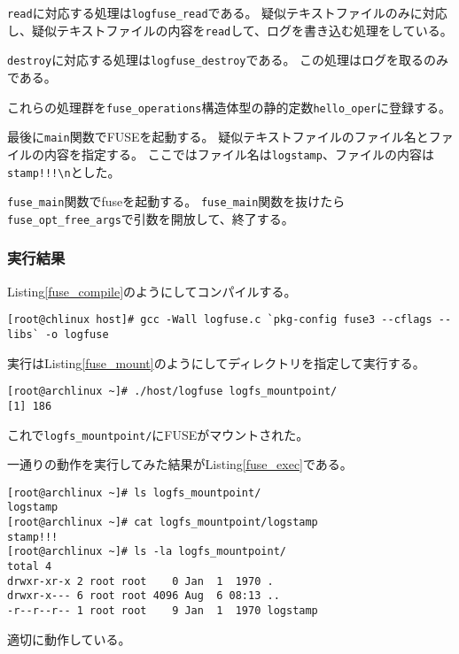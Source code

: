 \documentclass[main]{subfiles}
\begin{document}
\texttt{read}に対応する処理は\texttt{logfuse\_read}である。
疑似テキストファイルのみに対応し、疑似テキストファイルの内容を\texttt{read}して、ログを書き込む処理をしている。

\texttt{destroy}に対応する処理は\texttt{logfuse\_destroy}である。
この処理はログを取るのみである。

これらの処理群を\texttt{fuse\_operations}構造体型の静的定数\texttt{hello\_oper}に登録する。

最後に\texttt{main}関数でFUSEを起動する。
疑似テキストファイルのファイル名とファイルの内容を指定する。
ここではファイル名は\texttt{logstamp}、ファイルの内容は\texttt{stamp!!!{\textbackslash}n}とした。

\texttt{fuse\_main}関数でfuseを起動する。
\texttt{fuse\_main}関数を抜けたら\texttt{fuse\_opt\_free\_args}で引数を開放して、終了する。

\subsubsection{実行結果}

Listing\ref{fuse_compile}のようにしてコンパイルする。

\begin{lstlisting}[label=fuse_compile,caption=FUSEのコンパイル]
[root@chlinux host]# gcc -Wall logfuse.c `pkg-config fuse3 --cflags --libs` -o logfuse
\end{lstlisting}

実行はListing\ref{fuse_mount}のようにしてディレクトリを指定して実行する。

\begin{lstlisting}[label=fuse_mount,caption=マウントする]
[root@archlinux ~]# ./host/logfuse logfs_mountpoint/
[1] 186
\end{lstlisting}

これで\texttt{logfs\_mountpoint/}にFUSEがマウントされた。

一通りの動作を実行してみた結果がListing\ref{fuse_exec}である。

\begin{lstlisting}[label=fuse_exec,caption=FUSEの動作確認]
[root@archlinux ~]# ls logfs_mountpoint/
logstamp
[root@archlinux ~]# cat logfs_mountpoint/logstamp 
stamp!!!
[root@archlinux ~]# ls -la logfs_mountpoint/
total 4
drwxr-xr-x 2 root root    0 Jan  1  1970 .
drwxr-x--- 6 root root 4096 Aug  6 08:13 ..
-r--r--r-- 1 root root    9 Jan  1  1970 logstamp
\end{lstlisting}

適切に動作している。
\end{document}
